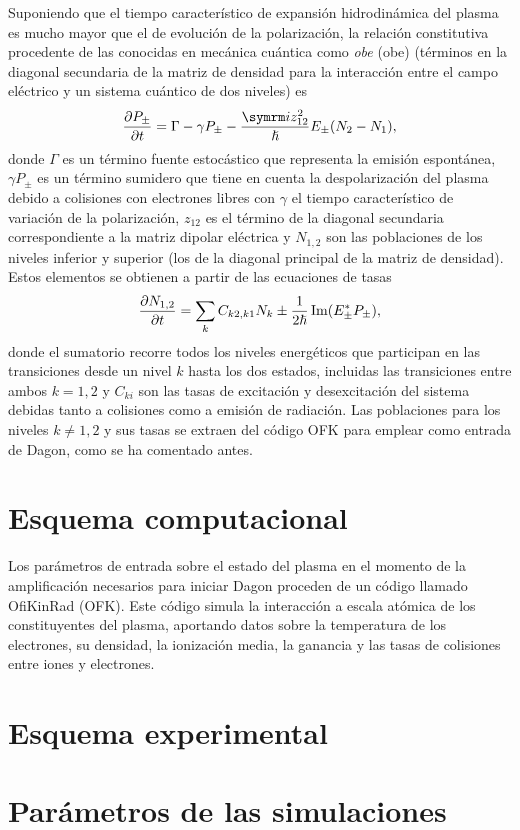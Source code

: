 Suponiendo que el tiempo característico de expansión hidrodinámica del plasma es mucho mayor que el de evolución de la polarización, la relación constitutiva procedente de las conocidas en mecánica cuántica como \emph{\acrlong{obe}} (\acrshort{obe}) (términos en la diagonal secundaria de la matriz de densidad para la interacción entre el campo eléctrico y un sistema cuántico de dos niveles) es
\begin{equation}
    \frac{\partial P_{\pm}}{\partial t} 
    =
    \Gamma - \gamma P_{\pm} - \frac{\iu z_{12}^2}{\hslash}E_{\pm}(N_2-N_1),
\end{equation}
donde $\Gamma$ es un término fuente estocástico que representa la emisión espontánea, $\gamma P_{\pm}$ es un término sumidero que tiene en cuenta la despolarización del plasma debido a colisiones con electrones libres con $\gamma$ el tiempo característico de variación de la polarización, $z_{12}$ es el término de la diagonal secundaria correspondiente a la matriz dipolar eléctrica y $N_{1,2}$ son las poblaciones de los niveles inferior y superior (los de la diagonal principal de la matriz de densidad). Estos elementos se obtienen a partir de las ecuaciones de tasas
\begin{equation}
    \frac{\partial N_{1,2}}{\partial t}
    =
    \sum_k C_{k2,k1}N_{k} \pm \frac{1}{2\hslash}\operatorname{Im}(E_{\pm}^*P_{\pm}),
\end{equation}
\noindent
donde el sumatorio recorre todos los niveles energéticos que participan en las transiciones desde un nivel $k$ hasta los dos estados, incluidas las transiciones entre ambos $k=1, 2$ y $C_{ki}$ son las tasas de excitación y desexcitación del sistema debidas tanto a colisiones como a emisión de radiación. Las poblaciones para los niveles $k\neq 1, 2$ y sus tasas se extraen del código OFK para emplear como entrada de Dagon, como se ha comentado antes.

\section{Esquema computacional}\label{sec:3.2}
Los parámetros de entrada sobre el estado del plasma en el momento de la amplificación necesarios para iniciar Dagon proceden de un código llamado OfiKinRad (OFK). Este código simula la interacción a escala atómica de los constituyentes del plasma, aportando datos sobre la temperatura de los electrones, su densidad, la ionización media, la ganancia y las tasas de colisiones entre iones y electrones.

\section{Esquema experimental}\label{sec:3.3}

\section{Parámetros de las simulaciones}\label{sec:3.4}
